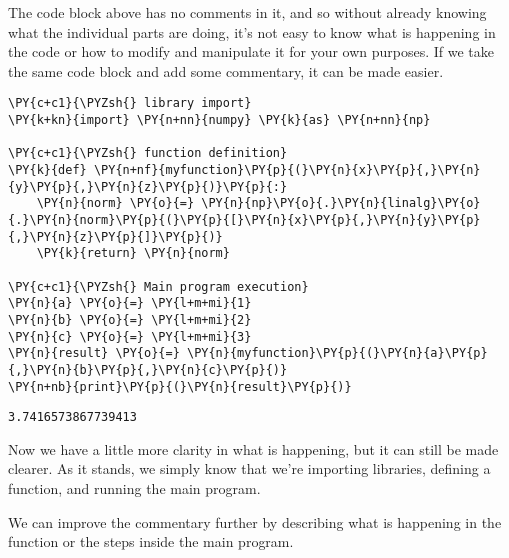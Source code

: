     The code block above has no comments in it, and so without already
knowing what the individual parts are doing, it's not easy to know what
is happening in the code or how to modify and manipulate it for your own
purposes. If we take the same code block and add some commentary, it can
be made easier.

    \begin{tcolorbox}[breakable, size=fbox, boxrule=1pt, pad at break*=1mm,colback=cellbackground, colframe=cellborder]
\begin{Verbatim}[commandchars=\\\{\}]
\PY{c+c1}{\PYZsh{} library import}
\PY{k+kn}{import} \PY{n+nn}{numpy} \PY{k}{as} \PY{n+nn}{np}

\PY{c+c1}{\PYZsh{} function definition}
\PY{k}{def} \PY{n+nf}{myfunction}\PY{p}{(}\PY{n}{x}\PY{p}{,}\PY{n}{y}\PY{p}{,}\PY{n}{z}\PY{p}{)}\PY{p}{:}
    \PY{n}{norm} \PY{o}{=} \PY{n}{np}\PY{o}{.}\PY{n}{linalg}\PY{o}{.}\PY{n}{norm}\PY{p}{(}\PY{p}{[}\PY{n}{x}\PY{p}{,}\PY{n}{y}\PY{p}{,}\PY{n}{z}\PY{p}{]}\PY{p}{)}
    \PY{k}{return} \PY{n}{norm}

\PY{c+c1}{\PYZsh{} Main program execution}
\PY{n}{a} \PY{o}{=} \PY{l+m+mi}{1}
\PY{n}{b} \PY{o}{=} \PY{l+m+mi}{2}
\PY{n}{c} \PY{o}{=} \PY{l+m+mi}{3}
\PY{n}{result} \PY{o}{=} \PY{n}{myfunction}\PY{p}{(}\PY{n}{a}\PY{p}{,}\PY{n}{b}\PY{p}{,}\PY{n}{c}\PY{p}{)}
\PY{n+nb}{print}\PY{p}{(}\PY{n}{result}\PY{p}{)}
\end{Verbatim}
\end{tcolorbox}

    \begin{Verbatim}[commandchars=\\\{\}]
3.7416573867739413
    \end{Verbatim}

    Now we have a little more clarity in what is happening, but it can still
be made clearer. As it stands, we simply know that we're importing
libraries, defining a function, and running the main program.

We can improve the commentary further by describing what is happening in
the function or the steps inside the main program.

